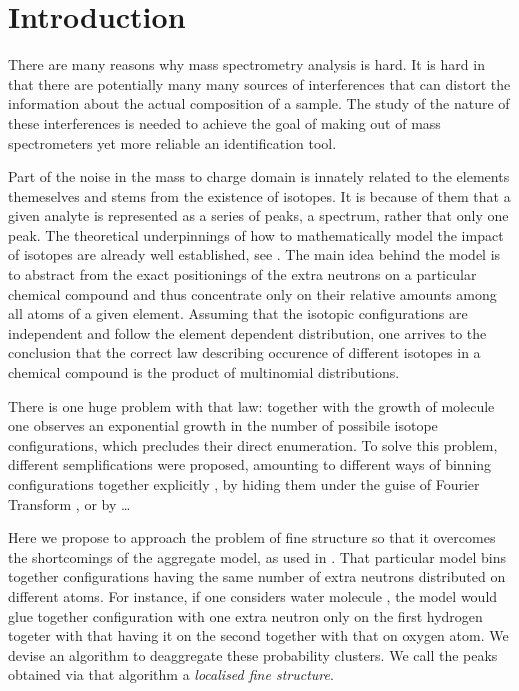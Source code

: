 \section{Introduction}

There are many reasons why mass spectrometry analysis is hard. It is hard in that there are potentially many many sources of interferences that can distort the information about the actual composition of a sample. The study of the nature of these interferences is needed to achieve the goal of making out of mass spectrometers yet more reliable an identification tool. 

Part of the noise in the mass to charge domain is innately related to the elements themeselves and stems from the existence of isotopes. It is because of them that a given analyte is represented as a series of peaks, a spectrum, rather that only one peak. The theoretical underpinnings of how to mathematically model the impact of isotopes are already well established, see \cite{Valkenborg2012Isotopic}. The main idea behind the model is to abstract from the exact positionings of the extra neutrons on a particular chemical compound and thus concentrate only on their relative amounts among all atoms of a given element. Assuming that the isotopic configurations are independent and follow the element dependent distribution, one arrives to the conclusion  that the correct law describing occurence of different isotopes in a chemical compound is the product of multinomial distributions. 

There is one huge problem with that law: together with the growth of molecule one observes an exponential growth in the number of possibile isotope configurations, which precludes their direct enumeration. To solve this problem, different semplifications were proposed, amounting to different ways of binning configurations together explicitly \cite{Claesen2012Efficient}, by hiding them under the guise of Fourier Transform \cite{Rockwood1995Relationship}, or by \dots 


Here we propose to approach the problem of fine structure so that it overcomes the shortcomings of the aggregate model, as used in \cite{Claesen2012Efficient}. That particular model bins together configurations having the same number of extra neutrons distributed on different atoms. For instance, if one considers water molecule , the model would glue together configuration with one extra neutron only on the first hydrogen togeter with that having it on the second together with that on oxygen atom. We devise an algorithm to deaggregate these probability clusters. We call the peaks obtained via that algorithm a {\it localised fine structure}. 


